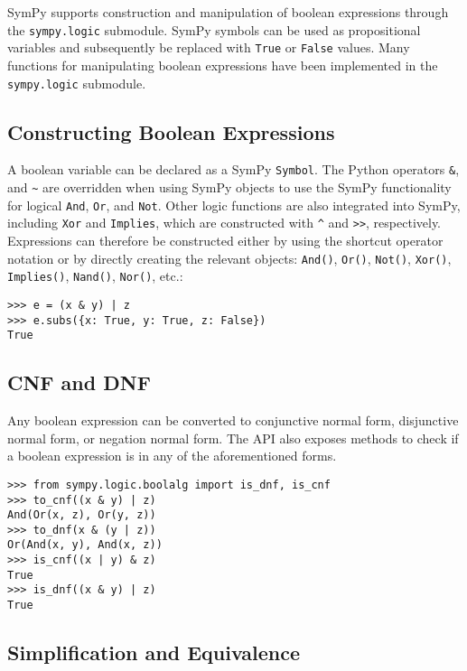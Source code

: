 
SymPy supports construction and manipulation of boolean expressions
through the \texttt{sympy.logic} submodule. SymPy symbols can be used as
propositional variables and subsequently be replaced with \texttt{True}
or \texttt{False} values. Many functions for manipulating boolean
expressions have been implemented in the \texttt{sympy.logic} submodule.

\subsection{Constructing Boolean Expressions}

A boolean variable can be declared as a SymPy \verb|Symbol|. The Python operators
\texttt{\&}, \texttt{\textbar{}} and \texttt{\textasciitilde{}} are overridden
when using SymPy objects to use the SymPy functionality for logical
\texttt{And}, \texttt{Or}, and \texttt{Not}. Other logic functions are also
integrated into SymPy, including \texttt{Xor} and \texttt{Implies}, which are
constructed with \texttt{\^{}} and \texttt{\textgreater{}\textgreater{}},
respectively. Expressions can therefore be constructed either by using
the shortcut operator notation or by directly creating the relevant
objects: \verb|And()|,
\verb|Or()|, \verb|Not()|, \verb|Xor()|, \verb|Implies()|, \verb|Nand()|,
\verb|Nor()|, etc.:

\begin{verbatim}
>>> e = (x & y) | z
>>> e.subs({x: True, y: True, z: False})
True
\end{verbatim}

\subsection{CNF and DNF}

Any boolean expression can be converted to conjunctive normal form, disjunctive
normal form, or negation normal form. The API also exposes methods to check if
a boolean expression is in any of the aforementioned forms.

\begin{verbatim}
>>> from sympy.logic.boolalg import is_dnf, is_cnf
>>> to_cnf((x & y) | z)
And(Or(x, z), Or(y, z))
>>> to_dnf(x & (y | z))
Or(And(x, y), And(x, z))
>>> is_cnf((x | y) & z)
True
>>> is_dnf((x & y) | z)
True
\end{verbatim}

\subsection{Simplification and Equivalence}

